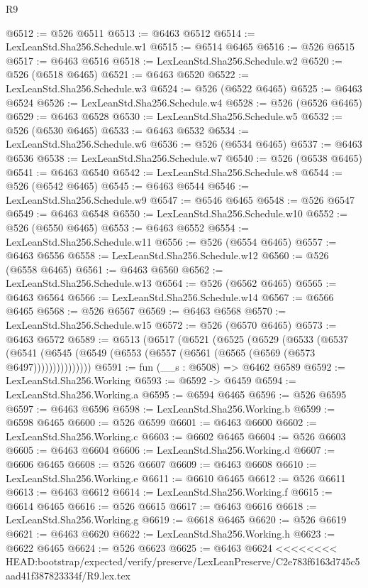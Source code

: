 \begin{lexlean}{R9}
\begin{coremodule}
{{{{{{{{{{{{{{{{{{{{{{{{{{{{{{{{{{{{{{{{{{{{{{{{{{{{{{{{{{{{{{{{{{{{{{{{{{{{{{{{{{{{@6512 := @526 @6511
@6513 := @6463 @6512
@6514 := LexLeanStd.Sha256.Schedule.w1
@6515 := @6514 @6465
@6516 := @526 @6515
@6517 := @6463 @6516
@6518 := LexLeanStd.Sha256.Schedule.w2
@6520 := @526 (@6518 @6465)
@6521 := @6463 @6520
@6522 := LexLeanStd.Sha256.Schedule.w3
@6524 := @526 (@6522 @6465)
@6525 := @6463 @6524
@6526 := LexLeanStd.Sha256.Schedule.w4
@6528 := @526 (@6526 @6465)
@6529 := @6463 @6528
@6530 := LexLeanStd.Sha256.Schedule.w5
@6532 := @526 (@6530 @6465)
@6533 := @6463 @6532
@6534 := LexLeanStd.Sha256.Schedule.w6
@6536 := @526 (@6534 @6465)
@6537 := @6463 @6536
@6538 := LexLeanStd.Sha256.Schedule.w7
@6540 := @526 (@6538 @6465)
@6541 := @6463 @6540
@6542 := LexLeanStd.Sha256.Schedule.w8
@6544 := @526 (@6542 @6465)
@6545 := @6463 @6544
@6546 := LexLeanStd.Sha256.Schedule.w9
@6547 := @6546 @6465
@6548 := @526 @6547
@6549 := @6463 @6548
@6550 := LexLeanStd.Sha256.Schedule.w10
@6552 := @526 (@6550 @6465)
@6553 := @6463 @6552
@6554 := LexLeanStd.Sha256.Schedule.w11
@6556 := @526 (@6554 @6465)
@6557 := @6463 @6556
@6558 := LexLeanStd.Sha256.Schedule.w12
@6560 := @526 (@6558 @6465)
@6561 := @6463 @6560
@6562 := LexLeanStd.Sha256.Schedule.w13
@6564 := @526 (@6562 @6465)
@6565 := @6463 @6564
@6566 := LexLeanStd.Sha256.Schedule.w14
@6567 := @6566 @6465
@6568 := @526 @6567
@6569 := @6463 @6568
@6570 := LexLeanStd.Sha256.Schedule.w15
@6572 := @526 (@6570 @6465)
@6573 := @6463 @6572
@6589 := @6513
    (@6517
      (@6521
        (@6525
          (@6529
            (@6533
              (@6537
                (@6541 (@6545 (@6549 (@6553 (@6557 (@6561 (@6565 (@6569 (@6573 @6497)))))))))))))))
@6591 := fun (__s : @6508) => @6462 @6589
@6592 := LexLeanStd.Sha256.Working
@6593 := @6592 -> @6459
@6594 := LexLeanStd.Sha256.Working.a
@6595 := @6594 @6465
@6596 := @526 @6595
@6597 := @6463 @6596
@6598 := LexLeanStd.Sha256.Working.b
@6599 := @6598 @6465
@6600 := @526 @6599
@6601 := @6463 @6600
@6602 := LexLeanStd.Sha256.Working.c
@6603 := @6602 @6465
@6604 := @526 @6603
@6605 := @6463 @6604
@6606 := LexLeanStd.Sha256.Working.d
@6607 := @6606 @6465
@6608 := @526 @6607
@6609 := @6463 @6608
@6610 := LexLeanStd.Sha256.Working.e
@6611 := @6610 @6465
@6612 := @526 @6611
@6613 := @6463 @6612
@6614 := LexLeanStd.Sha256.Working.f
@6615 := @6614 @6465
@6616 := @526 @6615
@6617 := @6463 @6616
@6618 := LexLeanStd.Sha256.Working.g
@6619 := @6618 @6465
@6620 := @526 @6619
@6621 := @6463 @6620
@6622 := LexLeanStd.Sha256.Working.h
@6623 := @6622 @6465
@6624 := @526 @6623
@6625 := @6463 @6624
<<<<<<<< HEAD:bootstrap/expected/verify/preserve/LexLeanPreserve/C2e783f6163d745c5aad41f387823334f/R9.lex.tex
}}}}}}}}}}}}}}}}}}}}}}}}}}}}}}}}}}}}}}}}}}}}}}}}}}}}}}}}}}}}}}}}}}}}}}}}}}}}}}}}}}}}
\end{coremodule}
\end{lexlean}
